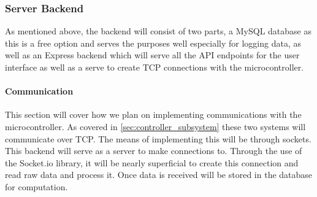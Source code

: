 \subsubsection{Server Backend}
As mentioned above, the backend will consist of two parts, a MySQL database as this is a free option and serves the purposes well especially for logging data, as well as an Express backend which will serve all the API endpoints for the user interface as well as a serve to create TCP connections with the microcontroller.
\paragraph{Communication}
This section will cover how we plan on implementing communications with the microcontroller. As covered in \ref{sec:controller_subsystem} these two systems will communicate over TCP. The means of implementing this will be through sockets. This backend will serve as a server to make connections to. Through the use of the Socket.io library, it will be nearly superficial to create this connection and read raw data and process it. Once data is received will be stored in the database for computation.
